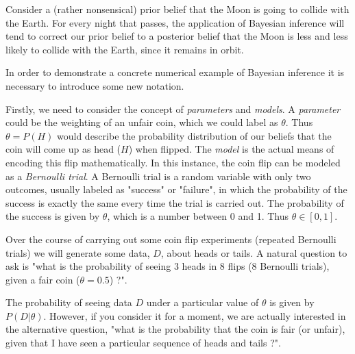 Consider a (rather nonsensical) prior belief that the Moon is going to collide with the Earth. For every night that passes, the application of Bayesian inference will tend to correct our prior belief to a posterior belief that the Moon is less and less likely to collide with the Earth, since it remains in orbit.

In order to demonstrate a concrete numerical example of Bayesian inference it is necessary to introduce some new notation.

Firstly, we need to consider the concept of \emph{parameters} and \emph{models}. A \emph{parameter} could be the weighting of an unfair coin, which we could label as $\theta$. Thus $\theta = P(H)$ would describe the probability distribution of our beliefs that the coin will come up as head ($H$) when flipped. The \emph{model} is the actual means of encoding this flip mathematically. In this instance, the coin flip can be modeled as a \emph{Bernoulli trial}. A Bernoulli trial is a random variable with only two outcomes, usually labeled as "success" or "failure", in which the probability of the success is exactly the same every time the trial is carried out. The probability of the success is given by $\theta$, which is a number between 0 and 1. Thus $\theta\in[0,1]$.

Over the course of carrying out some coin flip experiments (repeated Bernoulli trials) we will generate some data, $D$, about heads or tails. A natural question to ask is "what is the probability of seeing 3 heads in 8 flips (8 Bernoulli trials), given a fair coin ($\theta=0.5$) ?".

The probability of seeing data $D$ under a particular value of $\theta$ is given by $P(D|\theta)$. However, if you consider it for a moment, we are actually interested in the alternative question, "what is the probability that the coin is fair (or unfair), given that I have seen a particular sequence of heads and tails ?".

